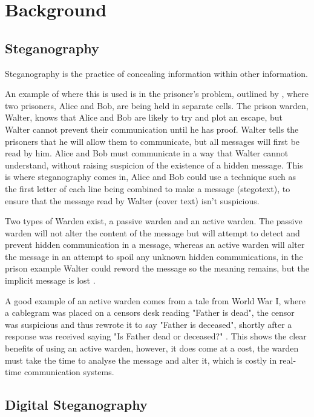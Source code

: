 \chapter{Background}
\label{ch:background}

\section{Steganography}

Steganography is the practice of concealing information within other information.

An example of where this is used is in the prisoner's problem, outlined by \cite{SIMMONS}, where two prisoners, Alice and Bob, are being held in separate cells. The prison warden, Walter, knows that Alice and Bob are likely to try and plot an escape, but Walter cannot prevent their communication until he has proof. Walter tells the prisoners that he will allow them to communicate, but all messages will first be read by him. Alice and Bob must communicate in a way that Walter cannot understand, without raising suspicion of the existence of a hidden message. This is where steganography comes in, Alice and Bob could use a technique such as the first letter of each line being combined to make a message (stegotext), to ensure that the message read by Walter (cover text) isn't suspicious.

Two types of Warden exist, a passive warden and an active warden. The passive warden will not alter the content of the message but will attempt to detect and prevent hidden communication in a message, whereas an active warden will alter the message in an attempt to spoil any unknown hidden communications, in the prison example Walter could reword the message so the meaning remains, but the implicit message is lost \citep{aSoCaSaAWA}.

A good example of an active warden comes from a tale from World War I, where a cablegram was placed on a censors desk reading "Father is dead", the censor was suspicious and thus rewrote it to say "Father is deceased", shortly after a response was received saying "Is Father dead or deceased?" \citep{TCTSoSW}. This shows the clear benefits of using an active warden, however, it does come at a cost, the warden must take the time to analyse the message and alter it, which is costly in real-time communication systems.

\section{Digital Steganography}

